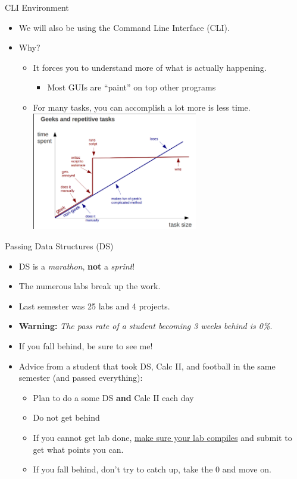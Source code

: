 \documentclass{beamer}
\begin{document}
\begin{frame}{CLI Environment}
\begin{itemize}
\item We will also be using the Command Line Interface (CLI).
\item Why?
\begin{itemize}
\item It forces you to understand more of what is actually happening.
\begin{itemize}
\item Most GUIs are ``paint'' on top other programs
\end{itemize}
\item For many tasks, you can accomplish a lot more is less time. \\
\includegraphics[width=0.6\textwidth]{../imgs/cli-vs-gui.png}
\end{itemize}
\end{itemize}
\end{frame}

\begin{frame}{Passing Data Structures (DS)}
\begin{itemize}
\item DS is a \textit{marathon}, \textbf{not} a \textit{sprint}!
\item The numerous labs break up the work.
\item Last semester was 25 labs and 4 projects.
\item \textbf{Warning:} \textit{The pass rate of a student becoming 3 weeks behind is 0\%}.
\item If you fall behind, be sure to see me!
\item Advice from a student that took DS, Calc II, and football in the same semester (and passed everything):
\begin{itemize}
\item Plan to do a some DS \textbf{and} Calc II each day
\item Do not get behind
\item If you cannot get lab done, \underline{make sure your lab compiles} and submit to get what points you can.
\item If you fall behind, don't try to catch up, take the 0 and move on.
\end{itemize}
\end{itemize}
\end{frame}
\end{document}
